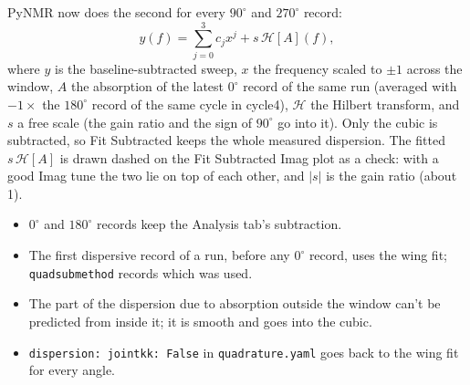\documentclass[11pt]{article}
\newcommand{\code}[1]{\texttt{\begingroup\def\_{\textunderscore\allowbreak}#1\endgroup}}
\begin{document}
PyNMR now does the second for every $90^\circ$ and $270^\circ$ record:
\begin{equation}
  y(f)=\sum_{j=0}^{3}c_j x^j + s\,\mathcal{H}[A](f),
\end{equation}
where $y$ is the baseline-subtracted sweep, $x$ the frequency scaled to $\pm1$ across the window, $A$ the
absorption of the latest $0^\circ$ record of the same run (averaged with $-1\times$ the $180^\circ$ record of the
same cycle in cycle4), $\mathcal H$ the Hilbert transform, and $s$ a free scale (the gain ratio and the sign of
$90^\circ$ go into it). Only the cubic is subtracted, so Fit Subtracted keeps the whole measured dispersion. The
fitted $s\,\mathcal H[A]$ is drawn dashed on the Fit Subtracted Imag plot as a check: with a good Imag tune the
two lie on top of each other, and $|s|$ is the gain ratio (about 1).
\begin{itemize}
\item $0^\circ$ and $180^\circ$ records keep the Analysis tab's subtraction.
\item The first dispersive record of a run, before any $0^\circ$ record, uses the wing fit;
  \code{quad\_sub\_method} records which was used.
\item The part of the dispersion due to absorption outside the window can't be predicted from inside it; it is
  smooth and goes into the cubic.
\item \code{dispersion: joint\_kk: False} in \code{quadrature.yaml} goes back to the wing fit for every angle.
\end{itemize}
\end{document}
